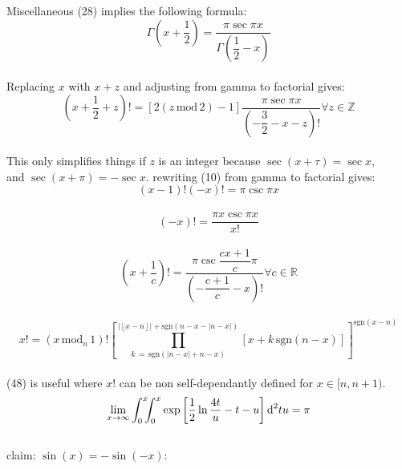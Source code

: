 \documentclass[12pt]{article}
\begin{document}
\pagebreak\begin{section}{Miscellaneous}
	(28) implies the following formula:
	\begin{equation}
		\Gamma\left(x+\dfrac12\right)=\dfrac{\pi\sec\pi x}{\Gamma\left(\dfrac12-x\right)}
	\end{equation}\\ %
	Replacing $x$ with $x+z$ and adjusting from gamma to factorial gives:\\
	\begin{equation}
		\left(x+\frac12+z\right)!=\left[2\left(z\,\text{mod}\,2\right)-1\right]
		\dfrac{\pi\sec\pi x}{\left(-\dfrac32-x-z\right)!}\forall z\in\mathbb Z
	\end{equation}\\ %
	This only simplifies things if $z$ is an integer because $\sec(x+\tau)=\sec x$,\\
	and $\sec(x+\pi)=-\sec x$. rewriting (10) from gamma to factorial gives:
	\begin{equation}
		(x-1)!(-x)!=\pi\csc\pi x
	\end{equation}\\ %
	\begin{equation}
		(-x)!=\dfrac{\pi x\csc\pi x}{x!}
	\end{equation}\\ %
	\begin{equation}
		\left(x+\dfrac1c\right)!=\dfrac{\pi\csc\dfrac{cx+1}c\pi}{\left(-\dfrac{c+1}c-x
		\right)!}\forall c\in\mathbb R
	\end{equation}\\ %
	\begin{equation}
		x!=\left(x\,\text{mod}_n\,1\right)!\left[\prod_{k\,=\,\text{sgn}(\left|n-x\right|+n-x)}^{
		\left|\left\lfloor x-n\right\rfloor\right|+\text{sgn}\left(n-x-\left|n-x\right|\right)}
		\left[x+k\,\text{sgn}\left(n-x\right)\right]\right]^{\text{sgn}\left(x-n\right)}
	\end{equation}\\ %
	(48) is useful where $x!$ can be non self-dependantly defined for $x\in[n,n+1)$.\\
	\begin{equation}
		\lim_{x\to\infty}\int_0^x\hspace{-0.5em}\int_0^x\exp\left[\dfrac12\ln\dfrac{4t}u-t-u
		\right]\text d^2tu=\pi
	\end{equation} %
	\pagebreak\\
	claim: $\sin(x)=-\sin(-x)$:\\

\end{section}
\end{document}
